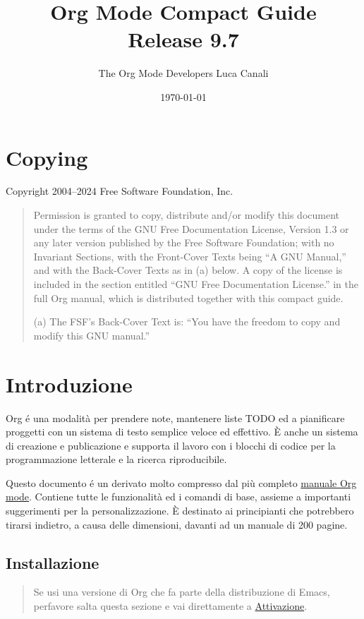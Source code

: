 \documentclass[11pt]{article}
\author{The Org Mode Developers Luca Canali}
\date{\today}
\title{Org Mode Compact Guide\\\medskip
\large Release 9.7}
\begin{document}
\maketitle
\tableofcontents


\section{Copying}
\label{sec:orgd8c88d7}
Copyright \textcopyright{} 2004--2024  Free Software Foundation, Inc.

\begin{quote}
Permission is granted to copy, distribute and/or modify this document
under the terms of the GNU Free Documentation License, Version 1.3 or
any later version published by the Free Software Foundation; with no
Invariant Sections, with the Front-Cover Texts being ``A GNU Manual,''
and with the Back-Cover Texts as in (a) below.  A copy of the license
is included in the section entitled ``GNU Free Documentation License.''
in the full Org manual, which is distributed together with this
compact guide.

(a) The FSF's Back-Cover Text is: ``You have the freedom to copy and
modify this GNU manual.''
\end{quote}

\section{Introduzione}
\label{sec:orgf679320}
Org é una modalità per prendere note, mantenere liste TODO ed a pianificare
proggetti con un sistema di testo semplice veloce ed effettivo. È anche un
sistema di creazione e publicazione e supporta il lavoro con i blocchi di
codice per la programmazione letterale e la ricerca riproducibile.

Questo documento é un derivato molto compresso dal più completo \href{https://www.gnu.org/software/emacs/manual/html\_mono/org.html\#Top}{manuale Org
mode}. Contiene tutte le funzionalità ed i comandi di base, assieme a
importanti suggerimenti per la personalizzazione. È destinato ai
principianti che potrebbero tirarsi indietro, a causa delle dimensioni,
davanti ad un manuale di 200 pagine.

\subsection*{Installazione}
\label{sec:org61fede0}
\begin{quote}
Se usi una versione di Org che fa parte della distribuzione di Emacs,
perfavore salta questa sezione e vai direttamente a \hyperref[sec:org316fc0b]{Attivazione}.
\end{quote}
\end{document}
